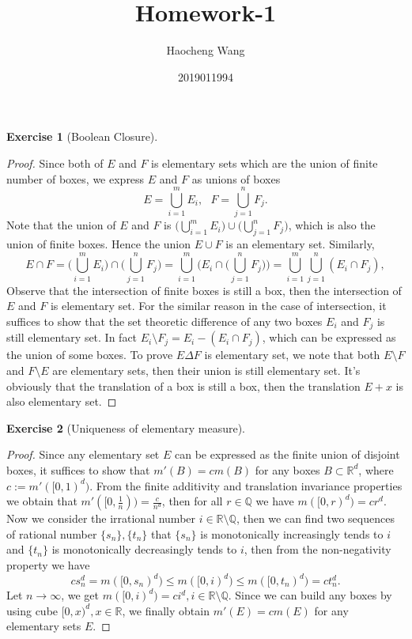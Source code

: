 \documentclass{article}
\author{Haocheng Wang \and 2019011994}
\title{Homework-1}
\begin{document}
\maketitle
\newtheorem{ex}{Exercise}[subsection]
\begin{ex}[Boolean Closure]\end{ex}
\begin{proof}
Since both of $E$ and  $F$ is elementary sets which are the union of finite number of boxes, we express $E$ and $F$
as unions of boxes $$
E = \bigcup_{i = 1}^m E_i,\ \ \ F = \bigcup_{j = 1}^n F_j.
$$
Note that the union of $E$ and $F$ is $\displaystyle \Big(\bigcup_{i = 1}^m E_i\Big) \cup \Big(\bigcup_{j = 1}^n F_j\Big)$,
which is also the union of finite boxes. Hence the union $E \cup F$ is an elementary set. Similarly,$$
E \cap F = \Big(\bigcup_{i = 1}^m E_i\Big) \cap \Big(\bigcup_{j = 1}^n F_j\Big) = \bigcup_{i = 1}^m \bigg( E_i 
\cap \Big( \bigcup_{j = 1}^n F_j\Big) \bigg) = \bigcup_{i = 1}^m \bigcup_{j = 1}^n (E_i \cap F_j),
$$Observe that the intersection of finite boxes is still a box, then the intersection of $E$ and $F$ is elementary set.
For the similar reason in the case of intersection, it suffices to show that the set theoretic difference of any two
boxes $E_i$ and $F_j$ is still elementary set. In fact $E_i \setminus F_j = E_i - (E_i \cap F_j)$, which can be 
expressed as the union of some boxes. To prove $E \Delta F$ is elementary set, we note that both $E \setminus F$
and $F \setminus E$ are elementary sets, then their union is still elementary set. It's obviously that the translation 
of a box is still a box, then the translation $E + x$ is also elementary set.
\end{proof}

\begin{ex}[Uniqueness of elementary measure]\end{ex}
\begin{proof}
Since any elementary set $E$ can be expressed as the finite union of disjoint boxes, it suffices to show that 
$m'(B) = cm(B)$ for any boxes $B \subset \mathbb{R}^d$, where $c := m'([0, 1)^d)$. From the finite additivity and 
translation invariance properties we obtain that $m'([0, \frac{1}{n})) = \frac{c}{n^d}$, then for all $r \in \mathbb{Q}$ 
we have $m([0, r)^d) = cr^d$. Now we consider the irrational number $i \in \mathbb{R} \setminus \mathbb{Q}$, then 
we can find two sequences of rational number $\{s_n\}, \{t_n\}$ that $\{s_n\}$ is monotonically increasingly tends to $i$ 
and $\{t_n\}$ is monotonically decreasingly tends to $i$, then from the non-negativity property we have $$
cs_n^d = m([0, s_n)^d) \leq m([0, i)^d) \leq m([0, t_n)^d) = ct_n^d.
$$Let $n \to \infty$, we get $m([0, i)^d) = ci^d, i \in \mathbb{R} \setminus \mathbb{Q}$. Since we can build any 
boxes by using cube $[0, x)^d, x \in \mathbb{R}$, we finally obtain $m'(E) = cm(E)$ for any elementary sets $E$.
\end{proof}
\end{document}
